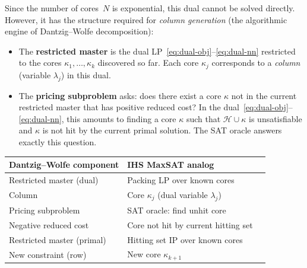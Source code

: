 Since the number of cores~$N$ is exponential, this dual cannot be solved
directly. However, it has the structure required for \emph{column generation}
(the algorithmic engine of Dantzig--Wolfe decomposition):
\begin{itemize}
\item The \textbf{restricted master} is the dual LP~\eqref{eq:dual-obj}--\eqref{eq:dual-nn} restricted to the cores $\kappa_1, \ldots, \kappa_k$ discovered so far. Each core $\kappa_j$ corresponds to a \emph{column} (variable $\lambda_j$) in this dual.
\item The \textbf{pricing subproblem} asks: does there exist a core $\kappa$ not in the current restricted master that has positive reduced cost? In the dual~\eqref{eq:dual-obj}--\eqref{eq:dual-nn}, this amounts to finding a core $\kappa$ such that $\mathcal{H} \cup \kappa$ is unsatisfiable and $\kappa$ is not hit by the current primal solution. The SAT oracle answers exactly this question.
\end{itemize}

\begin{center}
\begin{tabular}{lll}
\toprule
\textbf{Dantzig--Wolfe component} & \textbf{IHS MaxSAT analog} \\
\midrule
Restricted master (dual) & Packing LP over known cores \\
Column & Core $\kappa_j$ (dual variable $\lambda_j$) \\
Pricing subproblem & SAT oracle: find unhit core \\
Negative reduced cost & Core not hit by current hitting set \\
\midrule
Restricted master (primal) & Hitting set IP over known cores \\
New constraint (row) & New core $\kappa_{k+1}$ \\
\bottomrule
\end{tabular}
\end{center}


